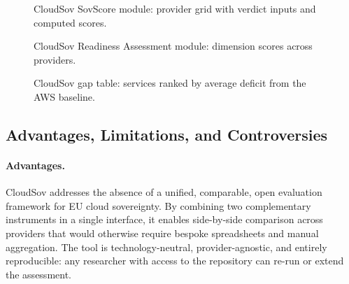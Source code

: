 \begin{figure}[htbp]
  \centering
  \caption{CloudSov SovScore module: provider grid with verdict inputs and computed scores.}
  \label{fig:tool_sovscore_grid}
\end{figure}

\begin{figure}[htbp]
  \centering
  \caption{CloudSov Readiness Assessment module: dimension scores across providers.}
  \label{fig:tool_readiness_chart}
\end{figure}

\begin{figure}[htbp]
  \centering
  \caption{CloudSov gap table: services ranked by average deficit from the AWS baseline.}
  \label{fig:tool_readiness_gap}
\end{figure}

\subsection{Advantages, Limitations, and Controversies}

\paragraph{Advantages.}
CloudSov addresses the absence of a unified, comparable, open evaluation framework for EU cloud sovereignty. By combining two complementary instruments in a single interface, it enables side-by-side comparison across providers that would otherwise require bespoke spreadsheets and manual aggregation. The tool is technology-neutral, provider-agnostic, and entirely reproducible: any researcher with access to the repository can re-run or extend the assessment.

